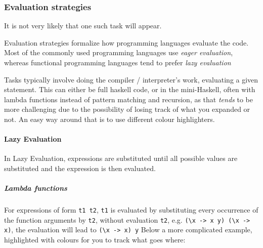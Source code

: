 \subsubsection{Evaluation strategies}
\begin{examdetails}
    It is not very likely that one such task will appear.
\end{examdetails}
Evaluation strategies formalize how programming languages evaluate the code.
Most of the commonly used programming languages use \textit{eager evaluation}, whereas functional programming languages tend to prefer \textit{lazy evaluation}

Tasks typically involve doing the compiler / interpreter's work, evaluating a given statement.
This can either be full haskell code, or in the mini-Haskell, often with lambda functions instead of pattern matching and recursion,
as that \textit{tends} to be more challenging due to the possibility of losing track of what you expanded or not.
An easy way around that is to use different colour highlighters.


\paragraph{Lazy Evaluation}
In Lazy Evaluation, expressions are substituted until all possible values are substituted and the expression is then evaluated.

\subparagraph{Lambda functions}
For expressions of form \texttt{t1 t2}, \texttt{t1} is evaluated by substituting every occurrence of the function arguments by \texttt{t2}, without evaluation \texttt{t2},
e.g. \verb|(\x -> x y) (\x -> x)|, the evaluation will lead to \verb|(\x -> x) y|
Below a more complicated example, highlighted with colours for you to track what goes where:

